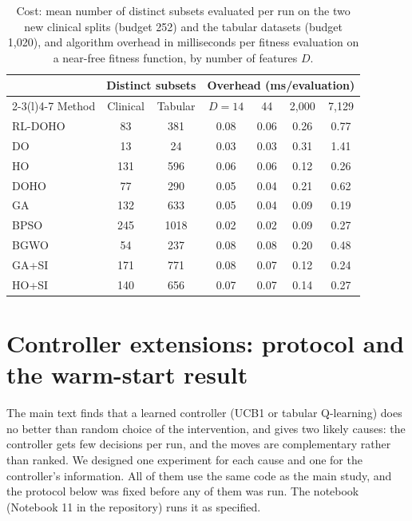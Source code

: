 \documentclass[journal]{IEEEtran}
\begin{document}
\begin{table}[h]
\centering
\caption{Cost: mean number of distinct subsets evaluated per run on the two new clinical splits (budget 252) and the tabular datasets (budget 1,020), and algorithm overhead in milliseconds per fitness evaluation on a near-free fitness function, by number of features $D$.}
\label{tab:cost}
\footnotesize
\setlength{\tabcolsep}{3pt}
\begin{tabular}{@{}lcccccc@{}}
\toprule
& \multicolumn{2}{c}{Distinct subsets} & \multicolumn{4}{c}{Overhead (ms/evaluation)} \\
\cmidrule(lr){2-3}\cmidrule(l){4-7}
Method & Clinical & Tabular & $D=14$ & 44 & 2,000 & 7,129 \\
\midrule
RL-DOHO & 83 & 381 & 0.08 & 0.06 & 0.26 & 0.77 \\
DO & 13 & 24 & 0.03 & 0.03 & 0.31 & 1.41 \\
HO & 131 & 596 & 0.06 & 0.06 & 0.12 & 0.26 \\
DOHO & 77 & 290 & 0.05 & 0.04 & 0.21 & 0.62 \\
\midrule
GA & 132 & 633 & 0.05 & 0.04 & 0.09 & 0.19 \\
BPSO & 245 & 1018 & 0.02 & 0.02 & 0.09 & 0.27 \\
BGWO & 54 & 237 & 0.08 & 0.08 & 0.20 & 0.48 \\
GA+SI & 171 & 771 & 0.08 & 0.07 & 0.12 & 0.24 \\
HO+SI & 140 & 656 & 0.07 & 0.07 & 0.14 & 0.27 \\
\bottomrule
\end{tabular}
\end{table}

\section{Controller extensions: protocol and the warm-start result}
The main text finds that a learned controller (UCB1 or tabular Q-learning) does no better than random choice of the intervention, and gives two likely causes: the controller gets few decisions per run, and the moves are complementary rather than ranked. We designed one experiment for each cause and one for the controller's information. All of them use the same code as the main study, and the protocol below was fixed before any of them was run. The notebook (Notebook 11 in the repository) runs it as specified.
\end{document}
